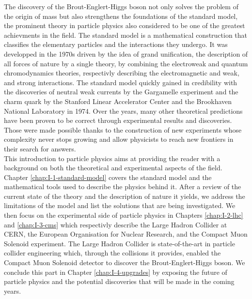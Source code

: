 The discovery of the Brout-Englert-Higgs boson not only solves the problem of the origin of mass but also strengthens the foundations of the standard model, the prominent theory in particle physics also considered to be one of the greatest achievments in the field. The standard model is a mathematical construction that classifies the elementary particles and the interactions they undergo. It was developped in the 1970s driven by the idea of grand unification, the description of all forces of nature by a single theory, by combining the electroweak and quantum chromodynamics theories, respectivly describing the electromagnetic and weak, and strong interactions. The standard model quickly gained in credibility with the discoveries of neutral weak currents by the Gargamelle experiment and the charm quark by the Stanford Linear Accelerator Center and the Brookhaven National Laboratory in 1974. Over the years, many other theoretical predictions have been proven to be correct through experimental results and discoveries. Those were made possible thanks to the construction of new experiments whose complexity never stops growing and allow physicists to reach new frontiers in their search for answers. \\

This introduction to particle physics aims at providing the reader with a background on both the theoretical and experimental aspects of the field. Chapter \ref{chap:I-1-standard-model} covers the standard model and the mathematical tools used to describe the physics behind it. After a review of the current state of the theory and the description of nature it yields, we address the limitations of the model and list the solutions that are being investigated. We then focus on the experimental side of particle physics in Chapters \ref{chap:I-2-lhc} and \ref{chap:I-3-cms} which respectivly describe the Large Hadron Collider at CERN, the European Organisation for Nuclear Research, and the Compact Muon Solenoid experiment. The Large Hadron Collider is state-of-the-art in particle collider engineering which, through the collisions it provides, enabled the Compact Muon Solenoid detector to discover the Brout-Englert-Higgs boson. We conclude this part in Chapter \ref{chap:I-4-upgrades} by exposing the future of particle physics and the potential discoveries that will be made in the coming years.
